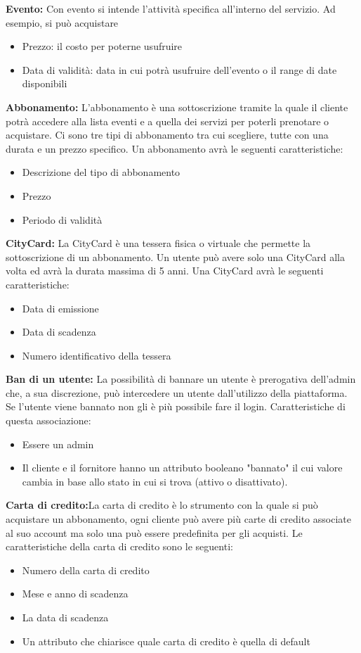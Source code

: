 \textbf{Evento:} Con evento si intende l'attività specifica all'interno del servizio. Ad esempio, si può acquistare
\begin{itemize}
    \item Prezzo: il costo per poterne usufruire
    \item Data di validità: data in cui potrà usufruire dell'evento o il range di date disponibili
\end{itemize}

\textbf{Abbonamento:} L'abbonamento è una sottoscrizione tramite la quale il cliente potrà accedere alla lista eventi e a quella dei servizi per poterli prenotare o acquistare. Ci sono tre tipi di abbonamento tra cui scegliere, tutte con una durata e un prezzo specifico.
Un abbonamento avrà le seguenti caratteristiche:
\begin{itemize}
    \item Descrizione del tipo di abbonamento
    \item Prezzo
    \item Periodo di validità
\end{itemize}

\textbf{CityCard:} La CityCard è una tessera fisica o virtuale che permette la sottoscrizione di un abbonamento.
Un utente può avere solo una CityCard alla volta ed avrà la durata massima di 5 anni.
Una CityCard avrà le seguenti caratteristiche:
\begin{itemize}
    \item Data di emissione
    \item Data di scadenza
    \item Numero identificativo della tessera
\end{itemize}

\textbf{Ban di un utente:} La possibilità di bannare un utente è prerogativa dell'admin che, a sua discrezione, può intercedere un utente dall'utilizzo della piattaforma. Se l'utente viene bannato non gli è più possibile fare il login.
Caratteristiche di questa associazione:
\begin{itemize}
    \item Essere un admin
    \item Il cliente e il fornitore hanno un attributo booleano "bannato" il cui valore cambia in base allo stato in cui si trova (attivo o disattivato).
\end{itemize}

\textbf{Carta di credito:}La carta di credito è lo strumento con la quale si può acquistare un abbonamento, ogni cliente può avere più carte di credito associate al suo account ma solo una può essere predefinita per gli acquisti.
Le caratteristiche della carta di credito sono le seguenti:
\begin{itemize}
    \item Numero della carta di credito
    \item Mese e anno di scadenza
    \item La data di scadenza
    \item Un attributo che chiarisce quale carta di credito è quella di default
\end{itemize}


